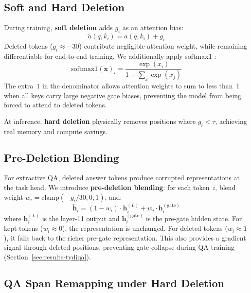 \documentclass[11pt,a4paper]{article}
\begin{document}
\subsection{Soft and Hard Deletion}

During training, \textbf{soft deletion} adds $g_i$ as an attention bias:
\begin{equation}
    \tilde{a}(q, k_i) = a(q, k_i) + g_i
\end{equation}
Deleted tokens ($g_i\approx-30$) contribute negligible attention weight, while remaining differentiable for end-to-end training. We additionally apply softmax1 \citep{kallini2024mrt5}:
\begin{equation}
    \text{softmax1}(\mathbf{x})_i = \frac{\exp(x_i)}{1 + \sum_j \exp(x_j)}
    \label{eq:softmax1}
\end{equation}
The extra~$1$ in the denominator allows attention weights to sum to less than~1 when all keys carry large negative gate biases, preventing the model from being forced to attend to deleted tokens.


At inference, \textbf{hard deletion} physically removes positions where $g_i<\tau$, achieving real memory and compute savings.


\subsection{Pre-Deletion Blending}
\label{sec:pre-deletion-blending}

For extractive QA, deleted answer tokens produce corrupted representations at the task head. We introduce \textbf{pre-deletion blending}: for each token~$i$, blend weight $w_i = \text{clamp}(-g_i/30,0,1)$, and:
\begin{equation}
    \tilde{\mathbf{h}}_i = (1-w_i)\cdot\mathbf{h}_i^{(L)} + w_i\cdot\mathbf{h}_i^{(\text{gate})}
    \label{eq:blending}
\end{equation}
where $\mathbf{h}_i^{(L)}$ is the layer-11 output and $\mathbf{h}_i^{(\text{gate})}$ is the pre-gate hidden state. For kept tokens ($w_i\approx0$), the representation is unchanged. For deleted tokens ($w_i\approx1$), it falls back to the richer pre-gate representation. This also provides a gradient signal through deleted positions, preventing gate collapse during QA training (Section~\ref{sec:results-tydiqa}).

\subsection{QA Span Remapping under Hard Deletion}
\label{sec:span-remapping}
\end{document}
